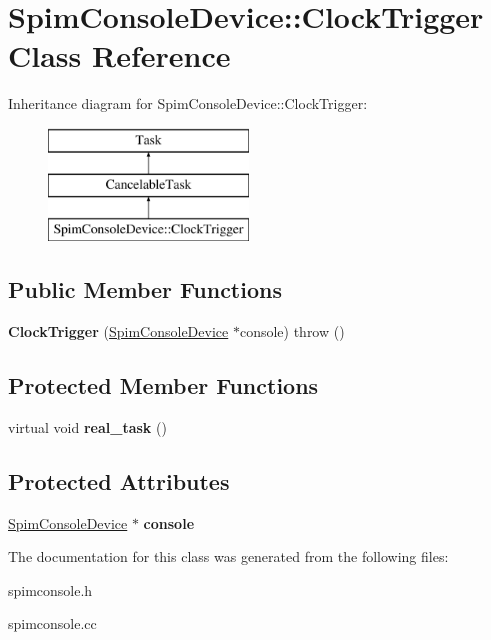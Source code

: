 \hypertarget{classSpimConsoleDevice_1_1ClockTrigger}{
\section{SpimConsoleDevice::ClockTrigger Class Reference}
\label{classSpimConsoleDevice_1_1ClockTrigger}
}
Inheritance diagram for SpimConsoleDevice::ClockTrigger:\begin{figure}[H]
\begin{center}
\leavevmode
\includegraphics[height=3cm]{classSpimConsoleDevice_1_1ClockTrigger}
\end{center}
\end{figure}
\subsection*{Public Member Functions}
\begin{DoxyCompactItemize}
\item 
\hypertarget{classSpimConsoleDevice_1_1ClockTrigger_a1189607fbee809e8cf3270458a850ffc}{
{\bfseries ClockTrigger} (\hyperlink{classSpimConsoleDevice}{SpimConsoleDevice} $\ast$console)  throw ()}
\label{classSpimConsoleDevice_1_1ClockTrigger_a1189607fbee809e8cf3270458a850ffc}

\end{DoxyCompactItemize}
\subsection*{Protected Member Functions}
\begin{DoxyCompactItemize}
\item 
\hypertarget{classSpimConsoleDevice_1_1ClockTrigger_afa3ddbdd65d8500444b79cb4887f0f0e}{
virtual void {\bfseries real\_\-task} ()}
\label{classSpimConsoleDevice_1_1ClockTrigger_afa3ddbdd65d8500444b79cb4887f0f0e}

\end{DoxyCompactItemize}
\subsection*{Protected Attributes}
\begin{DoxyCompactItemize}
\item 
\hypertarget{classSpimConsoleDevice_1_1ClockTrigger_ad6f7ff2dd63d8b147ba4aab3bc28281c}{
\hyperlink{classSpimConsoleDevice}{SpimConsoleDevice} $\ast$ {\bfseries console}}
\label{classSpimConsoleDevice_1_1ClockTrigger_ad6f7ff2dd63d8b147ba4aab3bc28281c}

\end{DoxyCompactItemize}


The documentation for this class was generated from the following files:\begin{DoxyCompactItemize}
\item 
spimconsole.h\item 
spimconsole.cc\end{DoxyCompactItemize}
